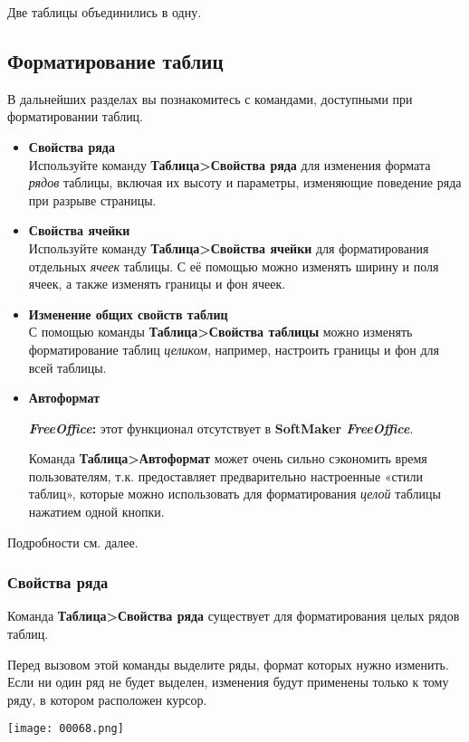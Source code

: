 ﻿\documentclass[a4paper,10pt]{article}
\begin{document}
Две таблицы объединились в одну.

\subsection{Форматирование таблиц}
В дальнейших разделах вы познакомитесь с командами, доступными при форматировании таблиц.
\begin{itemize}
 \item \textbf{Свойства ряда}\\
 Используйте команду \textbf{Таблица>Свойства ряда} для изменения формата \textit{рядов} таблицы, включая их высоту и параметры, изменяющие поведение ряда при разрыве страницы.
 \item \textbf{Свойства ячейки}\\
 Используйте команду \textbf{Таблица>Свойства ячейки} для форматирования отдельных \textit{ячеек} таблицы. С её помощью можно изменять ширину и поля ячеек, а также изменять границы и фон ячеек.
 \item \textbf{Изменение общих свойств таблиц}\\
 С помощью команды \textbf{Таблица>Свойства таблицы} можно изменять форматирование таблиц \textit{целиком}, например, настроить границы и фон для всей таблицы.
 \item \textbf{Автоформат}\\
 \begin{mdframed}[backgroundcolor=pink!50]
\textbf{\textit{FreeOffice}:} этот функционал отсутствует в \textbf{SoftMaker \textit{FreeOffice}}.
\end{mdframed}
Команда \textbf{Таблица>Автоформат} может очень сильно сэкономить время пользователям, т.к. предоставляет предварительно настроенные  «стили таблиц», которые можно использовать для форматирования \textit{целой} таблицы нажатием одной кнопки.
\end{itemize}

Подробности см. далее.

\subsubsection{Свойства ряда}
Команда \textbf{Таблица>Свойства ряда} существует для форматирования целых рядов таблиц.

Перед вызовом этой команды выделите ряды, формат которых нужно изменить. Если ни один ряд не будет выделен, изменения будут применены только к тому ряду, в котором расположен курсор.

\texttt{[image: 00068.png]}
\end{document}
